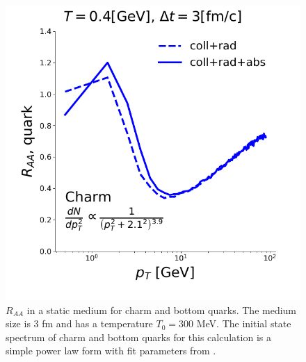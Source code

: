 \documentclass[aps, prc, reprint, amsmath, groupedaddress, nofootinbib]{revtex4-1}
\begin{document}
\begin{figure}
\includegraphics[width=\columnwidth]{BoxRaa.pdf}
\caption{$R_{AA}$ in a static medium for charm and bottom quarks. The medium size  is $3$ fm and has a temperature $T_0 = 300$ MeV. The initial state spectrum of charm and bottom quarks for this calculation is a simple power law form with fit parameters from \cite{Cao:2012jt}.}\label{plots:BoxRaa}
\end{figure}
\end{document}
